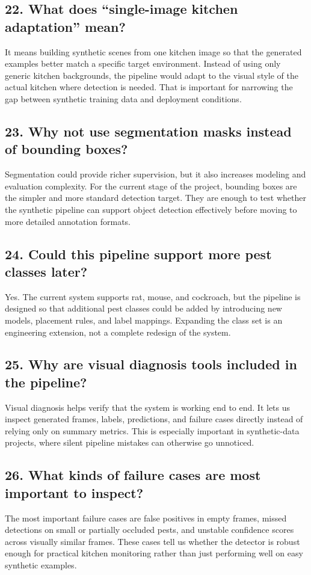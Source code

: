 \documentclass[11pt]{article}
\begin{document}
\subsection*{22. What does ``single-image kitchen adaptation'' mean?}
It means building synthetic scenes from one kitchen image so that the generated examples better match a specific target environment. Instead of using only generic kitchen backgrounds, the pipeline would adapt to the visual style of the actual kitchen where detection is needed. That is important for narrowing the gap between synthetic training data and deployment conditions.

\subsection*{23. Why not use segmentation masks instead of bounding boxes?}
Segmentation could provide richer supervision, but it also increases modeling and evaluation complexity. For the current stage of the project, bounding boxes are the simpler and more standard detection target. They are enough to test whether the synthetic pipeline can support object detection effectively before moving to more detailed annotation formats.

\subsection*{24. Could this pipeline support more pest classes later?}
Yes. The current system supports rat, mouse, and cockroach, but the pipeline is designed so that additional pest classes could be added by introducing new models, placement rules, and label mappings. Expanding the class set is an engineering extension, not a complete redesign of the system.

\subsection*{25. Why are visual diagnosis tools included in the pipeline?}
Visual diagnosis helps verify that the system is working end to end. It lets us inspect generated frames, labels, predictions, and failure cases directly instead of relying only on summary metrics. This is especially important in synthetic-data projects, where silent pipeline mistakes can otherwise go unnoticed.

\subsection*{26. What kinds of failure cases are most important to inspect?}
The most important failure cases are false positives in empty frames, missed detections on small or partially occluded pests, and unstable confidence scores across visually similar frames. These cases tell us whether the detector is robust enough for practical kitchen monitoring rather than just performing well on easy synthetic examples.
\end{document}
